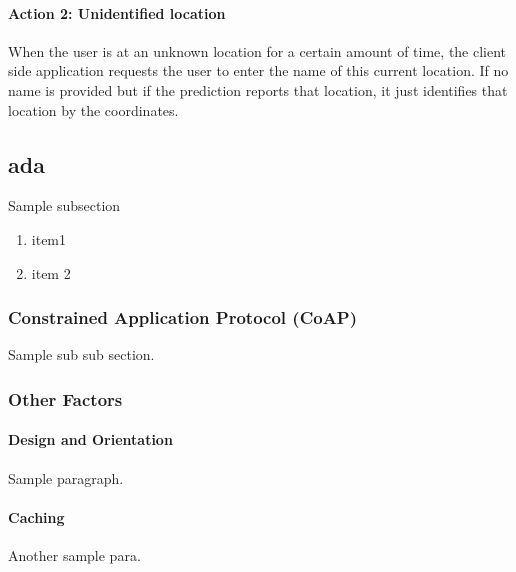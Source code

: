 \documentclass[conference]{IEEEtran}
\begin{document}
\paragraph{Action 2: Unidentified location}
When the user is at an unknown location for a certain amount of time, the client side application requests the user to enter the name of this current location. If no name is provided but if the prediction reports that location, it just identifies that location by the coordinates.

\subsection{ada}
Sample subsection
\begin{enumerate}
  \item item1
  \item item 2
\end{enumerate}

\subsubsection{Constrained Application Protocol (CoAP)}
Sample sub sub section.


\subsubsection{Other Factors}
\paragraph{Design and Orientation}
Sample paragraph.

\paragraph{Caching}
Another sample para.


\begin{table}[h!]
  \centering
  \caption{Avg Packet Received Ratio}
  \label{tab:label_test}
\end{table}
\end{document}
